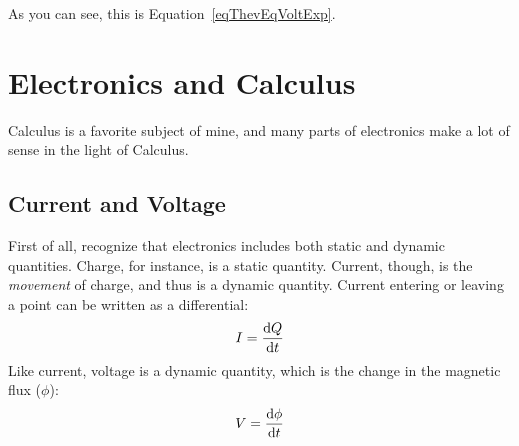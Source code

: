 As you can see, this is Equation~\ref{eqThevEqVoltExp}.


\section{Electronics and Calculus}

Calculus is a favorite subject of mine, and many parts of electronics make a lot of sense in the light of Calculus.

\subsection{Current and Voltage}
First of all, recognize that electronics includes both static and dynamic quantities. 
Charge, for instance, is a static quantity.
Current, though, is the \emph{movement} of charge, and thus is a dynamic quantity.
Current entering or leaving a point can be written as a differential:
\begin{equation}
I = \frac{\mathrm{d}Q}{\mathrm{d}t}
\end{equation}
Like current, voltage is a dynamic quantity, which is the change in the magnetic flux ($\phi$):
\begin{equation}
V = \frac{\mathrm{d}\phi}{\mathrm{d}t}
\end{equation}

